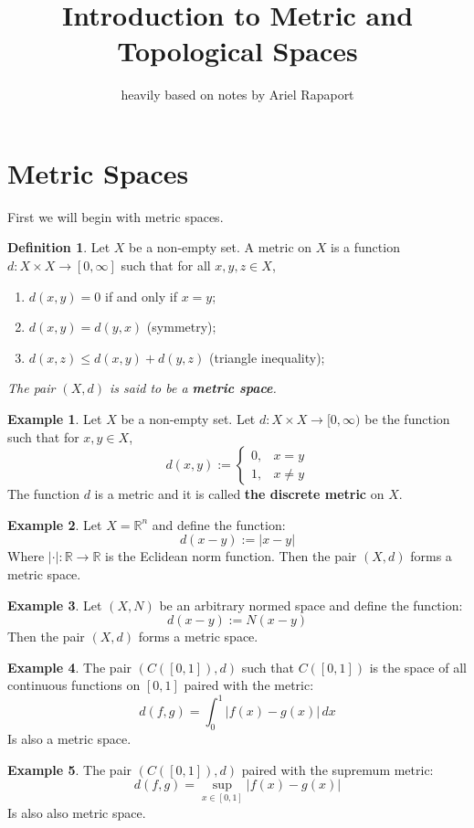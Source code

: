 \documentclass[11pt,a4paper]{article}
\title{\textbf{Introduction to Metric and Topological Spaces}}
\author{heavily based on notes by Ariel Rapaport}
\date{}
\theoremstyle{definition}
\newtheorem{definition}{Definition}[section]
\newtheorem{example}{Example}[section]
\theoremstyle{plain}
\newcommand{\R}{\mathbb{R}}
\begin{document}
	\maketitle
	\newpage
	\section{Metric Spaces}
	First we will begin with metric spaces.
	\begin{definition}
	Let $X$ be a non-empty set. A metric on $X$ is a function 
	$d \colon X \times X \to [0,\infty]$ such that for all $x,y,z \in X$,
	\end{definition}
	\begin{enumerate}
	\item $d(x,y) = 0$ if and only if $x = y$;
	\item $d(x,y) = d(y,x)$ (symmetry);
	\item $d(x,z) \le d(x,y) + d(y,z)$ (triangle inequality);
	\end{enumerate}
	\emph{The pair $(X,d)$ is said to be a \textbf{metric space}.}
	\begin{example}
	Let $X$ be a non-empty set. Let $d \colon X \times X \to [0,\infty)$ be
	the function such that for $x,y \in X$,
	\[
		d(x,y) := \begin{cases}
			0, & x=y \\
			1, & x \neq y
		\end{cases}
	\]
	The function $d$ is a metric and it is called \textbf{the discrete metric}
	on $X$.
	\end{example}
	\begin{example}
	Let $X = \R^n$ and define the function:
	\[
		d(x-y) := |x - y|
	\]
	Where $|\cdot | \colon \R \to \R$ is the Eclidean norm function. 
	Then the pair $(X, d)$ forms a metric space.
	\end{example}
	\begin{example}
	Let $(X, N)$ be an arbitrary normed space and define the function:
	\[
		d(x-y) := N(x - y)
	\] 
	Then the pair $(X, d)$ forms a metric space.
	\end{example}
	\begin{example}
	The pair $(C([0,1]), d)$ such that $C([0,1])$ is the space of all
	continuous functions on $[0,1]$ paired with the metric:
	\[
		d(f,g) = \int_{0}^{1}{|f(x) - g(x)|\,dx}
	\]
	Is also a metric space.
	\end{example}
	\begin{example}
	The pair $(C([0,1]), d)$ paired with the supremum metric:
	\[
		d(f,g) = \sup_{x \in [0,1]}{|f(x) - g(x)|}
	\]
	Is also also metric space.
	\end{example}
\end{document}
